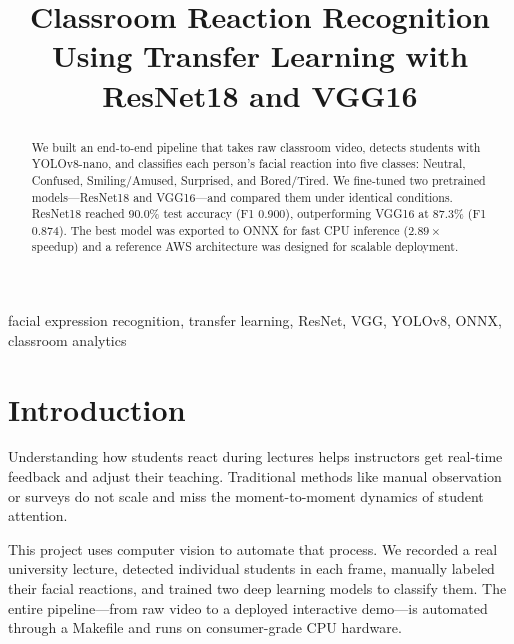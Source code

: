 \documentclass[conference]{IEEEtran}
\begin{document}
\title{Classroom Reaction Recognition Using Transfer Learning with ResNet18 and VGG16}

\author{%
}

\maketitle

\begin{abstract}
We built an end-to-end pipeline that takes raw classroom video, detects students with YOLOv8-nano, and classifies each person's facial reaction into five classes: Neutral, Confused, Smiling/Amused, Surprised, and Bored/Tired. We fine-tuned two pretrained models---ResNet18 and VGG16---and compared them under identical conditions. ResNet18 reached 90.0\% test accuracy (F1 0.900), outperforming VGG16 at 87.3\% (F1 0.874). The best model was exported to ONNX for fast CPU inference ($2.89\times$ speedup) and a reference AWS architecture was designed for scalable deployment.
\end{abstract}

\begin{IEEEkeywords}
facial expression recognition, transfer learning, ResNet, VGG, YOLOv8, ONNX, classroom analytics
\end{IEEEkeywords}

\section{Introduction}

Understanding how students react during lectures helps instructors get real-time feedback and adjust their teaching. Traditional methods like manual observation or surveys do not scale and miss the moment-to-moment dynamics of student attention.

This project uses computer vision to automate that process. We recorded a real university lecture, detected individual students in each frame, manually labeled their facial reactions, and trained two deep learning models to classify them. The entire pipeline---from raw video to a deployed interactive demo---is automated through a Makefile and runs on consumer-grade CPU hardware.
\end{document}
